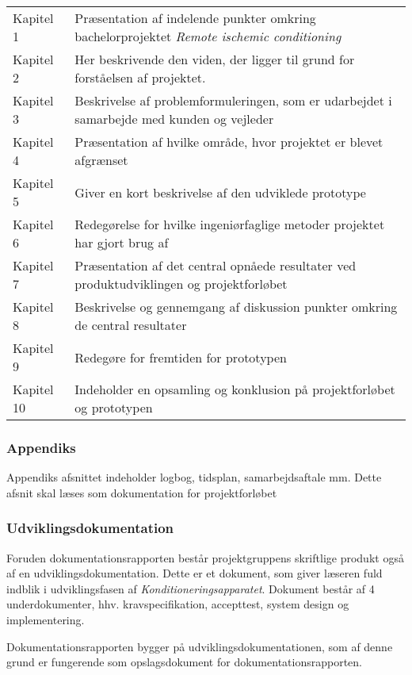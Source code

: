 	\begin{longtable}{ p{} p{} } 
		Kapitel 1 & Præsentation af indelende punkter omkring bachelorprojektet \textit{Remote ischemic conditioning}\\
		Kapitel 2 & Her beskrivende den viden, der ligger til grund for forståelsen af projektet. \\
		Kapitel 3 & Beskrivelse af problemformuleringen, som er udarbejdet i samarbejde med kunden og vejleder\\
		Kapitel 4 & Præsentation af hvilke område, hvor projektet er blevet afgrænset\\
		Kapitel 5 & Giver en kort beskrivelse af den udviklede prototype\\
		Kapitel 6 & Redegørelse for hvilke ingeniørfaglige metoder projektet har gjort brug af \\
		Kapitel 7 & Præsentation af det central opnåede resultater ved produktudviklingen og projektforløbet\\
		Kapitel 8 & Beskrivelse og gennemgang af diskussion punkter omkring de central resultater\\
		Kapitel 9 & Redegøre for fremtiden for prototypen\\
		Kapitel 10& Indeholder en opsamling og konklusion på projektforløbet og prototypen\\
	\end{longtable}

\subsubsection{Appendiks}
Appendiks afsnittet indeholder logbog, tidsplan, samarbejdsaftale mm. Dette afsnit skal læses som dokumentation for projektforløbet

\subsubsection{Udviklingsdokumentation}
Foruden dokumentationsrapporten består projektgruppens skriftlige produkt også af en udviklingsdokumentation. Dette er et dokument, som giver læseren fuld indblik i udviklingsfasen af \textit{Konditioneringsapparatet}. Dokument består af 4 underdokumenter, hhv. kravspecifikation, accepttest, system design og implementering. 

Dokumentationsrapporten bygger på udviklingsdokumentationen, som af denne grund er fungerende som opslagsdokument for dokumentationsrapporten. 



